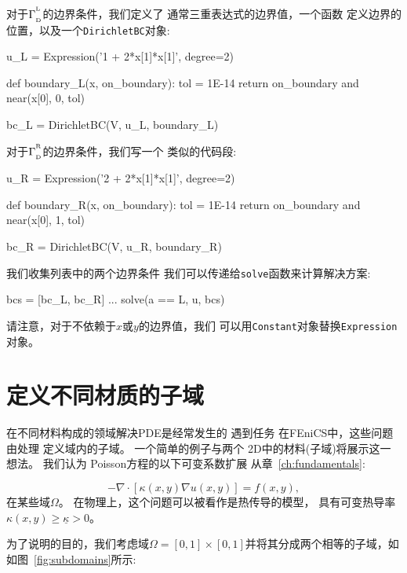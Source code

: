 对于$\GD^{^{\mathrm{L}}}$的边界条件，我们定义了
通常三重表达式的边界值，一个函数
定义边界的位置，以及一个\texttt{DirichletBC}对象:

\begin{python}
u_L = Expression('1 + 2*x[1]*x[1]', degree=2)

def boundary_L(x, on_boundary):
    tol = 1E-14
    return on_boundary and near(x[0], 0, tol)

bc_L = DirichletBC(V, u_L, boundary_L)
\end{python}
对于$\GD^{^{\mathrm{R}}}$的边界条件，我们写一个
类似的代码段:

\begin{python}
u_R = Expression('2 + 2*x[1]*x[1]', degree=2)

def boundary_R(x, on_boundary):
    tol = 1E-14
    return on_boundary and near(x[0], 1, tol)

bc_R = DirichletBC(V, u_R, boundary_R)
\end{python}
我们收集列表中的两个边界条件
我们可以传递给\texttt{solve}函数来计算解决方案:

\begin{python}
bcs = [bc_L, bc_R]
...
solve(a == L, u, bcs)
\end{python}

请注意，对于不依赖于$x$或$y$的边界值，我们
可以用\texttt{Constant}对象替换\texttt{Expression}对象。

\section{定义不同材质的子域}
\label{ftut:possion:2D:2mat:impl}


在不同材料构成的领域解决PDE是经常发生的
遇到任务 在FEniCS中，这些问题由处理
定义域内的子域。 一个简单的例子与两个
2D中的材料(子域)将展示这一想法。 我们认为
Poisson方程的以下可变系数扩展
从章~\ref{ch:fundamentals}:

\begin{equation} \label{ch:poisson0:2D:2mat:varcoeff2}
  -\nabla \cdot \left\lbrack \kappa(x,y)\nabla u(x,y)\right\rbrack =
  f(x, y),
\end{equation}
在某些域$\Omega$。
在物理上，这个问题可以被看作是热传导的模型，
具有可变热导率$\kappa(x,y) \geq
\underline{\kappa} > 0$。

为了说明的目的，我们考虑域$\Omega =
[0,1]\times [0,1]$并将其分成两个相等的子域，如
如图~\ref{fig:subdomains}所示:

